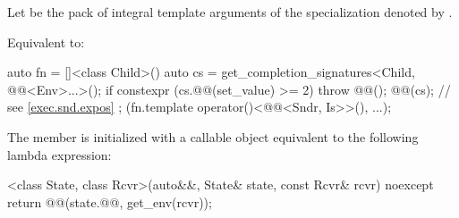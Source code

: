 \begin{itemdescr}
\pnum
Let  be the pack of integral template arguments of
the  specialization denoted by
.

\pnum
\effects
Equivalent to:
\begin{codeblock}
auto fn = []<class Child>() {
  auto cs = get_completion_signatures<Child, @@<Env>...>();
  if constexpr (cs.@@(set_value) >= 2)
    throw @@();
  @@(cs); // see \ref{exec.snd.expos}
};
(fn.template operator()<@@<Sndr, Is>>(), ...);
\end{codeblock}
\end{itemdescr}

\pnum
The member 
is initialized with a callable object
equivalent to the following lambda expression:
\begin{codeblock}
[]<class State, class Rcvr>(auto&&, State& state, const Rcvr& rcvr) noexcept {
  return @@(state.@@, get_env(rcvr));
}
\end{codeblock}

